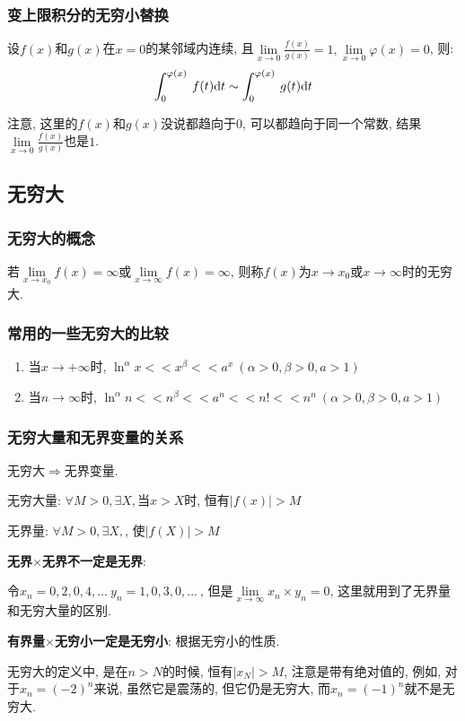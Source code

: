 \subsubsection{变上限积分的无穷小替换}
设$ f(x) $和$ g(x) $在$ x=0 $的某邻域内连续, 且$ \lim\limits_{x \rightarrow 0}\frac{f(x)}{g(x)}=1, \lim\limits_{x \rightarrow 0}\varphi(x)=0 $, 则:
\begin{equation*}
    \displaystyle\int_{0}^{\varphi(x)}\hspace{.2em}f(t)\mathrm{d}t\sim \displaystyle\int_{0}^{\varphi(x)}\hspace{.2em}g(t)\mathrm{d}t
\end{equation*}\par
注意, 这里的$ f(x) $和$ g(x) $没说都趋向于$ 0 $, 可以都趋向于同一个常数, 结果$ \lim\limits_{x \rightarrow 0}\frac{f(x)}{g(x)} $也是$ 1 $.
\subsection{无穷大}
\subsubsection{无穷大的概念}
若$ \lim\limits_{x \rightarrow x_{0}}f(x)=\infty $或$ \lim\limits_{x \rightarrow \infty}f(x)=\infty $, 则称$ f(x) $为$ x\rightarrow x_{0} $或$ x\rightarrow \infty $时的无穷大.
\subsubsection{常用的一些无穷大的比较}
\begin{enumerate}
    \item 当$ x\rightarrow +\infty $时, $ \ln^{\alpha}x<<x^{\beta}<<a^{x}\ (\alpha>0, \beta>0, a>1) $
    \item 当$ n\rightarrow \infty $时, $ \ln^{\alpha}n<<n^{\beta}<<a^{n}<<n!<<n^{n}\ (\alpha>0, \beta>0, a>1) $
\end{enumerate}
\subsubsection{无穷大量和无界变量的关系}
无穷大$ \Rightarrow $无界变量.\par
无穷大量: $ \forall M>0, \exists X, $当$ x>X $时, 恒有$ |f(x)|>M $ \par
无界量: $ \forall M>0, \exists X, $, 使$ |f(X)|>M $
\begin{tcolorbox}
    \textbf{无界$ \times $无界不一定是无界}:\par 令$ x_{n}=0,2,0,4,...\ y_{n}=1,0,3,0,...\ $, 但是$ \lim\limits_{x \rightarrow \infty}x_{n}\times y_{n}=0 $, 这里就用到了无界量和无穷大量的区别.\par \vspace{.5em}
    \textbf{有界量$ \times $无穷小一定是无穷小}: 根据无穷小的性质.\par \vspace{.5em}
    无穷大的定义中, 是在$ n>N $的时候, 恒有$ |x_{N}|>M $, 注意是带有绝对值的, 例如, 对于$ x_{n}=(-2)^{n} $来说, 虽然它是震荡的, 但它仍是无穷大, 而$ x_{n}=(-1)^{n} $就不是无穷大.
\end{tcolorbox}
